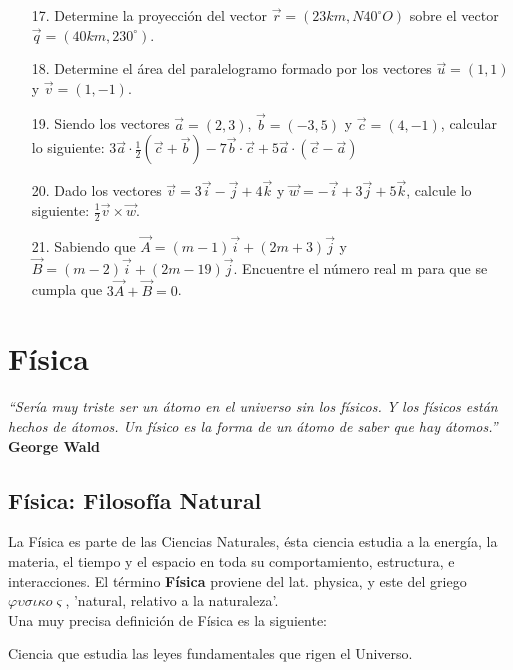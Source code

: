 \documentclass[a5paper,pagesize,10pt,bibtotoc,pointlessnumbers,
normalheadings,DIV=9,fleqn,x11names,table,twoside=false]{scrbook}
\begin{document}
\begin{itemize}
\item[17.] Determine la proyección del vector $\vec{r} = (23 km, N40^\circ O)$ sobre el vector $\vec{q}=(40km,230^\circ)$.
\item[18.] Determine el área del paralelogramo formado por los vectores $\vec{u}=(1,1)$ y $\vec{v}=(1,-1)$.
\item[19.] Siendo los vectores $\vec{a} = (2,3)$, $\vec{b} = (-3,5)$ y $\vec{c} = (4,-1)$, calcular lo siguiente: 
$3\vec{a}\cdot\frac{1}{2}(\vec{c}+\vec{b})-7\vec{b}\cdot\vec{c}+5\vec{a}\cdot(\vec{c}-\vec{a})$ 
\item[20.] Dado los vectores $\vec{v} = 3\vec{i}-\vec{j}+4\vec{k}$ y $\vec{w}=-\vec{i}+3\vec{j}+5\vec{k}$, calcule lo 
siguiente: $\frac{1}{2}\vec{v}\times\vec{w}$.
\item[21.] Sabiendo que $\vec{A} = (m - 1) \vec{i} + (2 m + 3) \vec{j}$ y $\vec{B} = (m - 2) \vec{i} + (2 m - 19) \vec{j}$. 
Encuentre el número real m para que se cumpla que $3 \vec{A} + \vec{B} = 0$.

\end{itemize}

\chapter{Física}

\textit{``Sería muy triste ser un átomo en el universo sin los físicos. Y los físicos están hechos de átomos. Un físico es la 
forma de un átomo de saber que hay átomos.''} \textbf{George Wald}
\vspace{1.0 cm}

\section{Física: Filosofía Natural}

La Física es parte de las Ciencias Naturales, ésta ciencia estudia a la energía, la materia, el tiempo y el espacio en toda su 
comportamiento, estructura, e interacciones. El término \textbf{Física} proviene del lat. physica, y este del griego 
$\varphi\upsilon\sigma\iota\kappa o\varsigma$, 'natural, relativo a la naturaleza'.\\

Una muy precisa definición de Física es la siguiente:

\begin{tcolorbox}
Ciencia que estudia las leyes fundamentales que rigen el Universo.
\end{tcolorbox}
\end{document}
